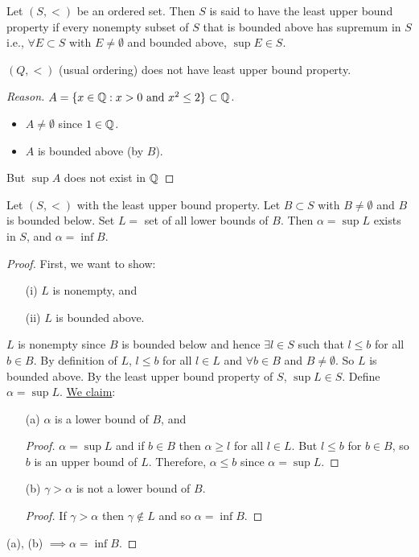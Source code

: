 \documentclass[]{article}
\begin{document}
\begin{definition}
	 Let $(S,<)$ be an ordered set. Then $S$ is said to have the least upper bound property if every nonempty subset of $S$ that is bounded above has supremum in $S$ i.e., $\forall E\subset S$ with $E\neq \emptyset$ and bounded above, $\sup E \in S$.
\end{definition}
\begin{example}
	$(Q,<)$ (usual ordering) does not have least upper bound property.
	
	\begin{proof}
		[Reason] $A = \{x\in\mathbb{Q}: x>0 \text{ and } x^2\leq 2\}\subset \mathbb{Q}$. 
		\begin{itemize}
			\item $A\neq\emptyset$ since $1\in \mathbb{Q}$.
			\item $A$ is bounded above (by $B$).
		\end{itemize}
		But $\sup A$ does not exist in $\mathbb{Q}$
	\end{proof}
\end{example}

\begin{theorem}
	Let $(S,<)$ with the least upper bound property. Let $B\subset S$ with $B\neq \emptyset$ and $B$ is bounded below.
	Set $L = $ set of all lower bounds of $B$. Then $\alpha = \sup L$ exists in $S$, and $\alpha = \inf B$.
\end{theorem}
	\begin{proof}
		First, we want to show:
		\begin{enumerate}
			\item[(i)] $L$ is nonempty, and
			\item[(ii)] $L$ is bounded above.
		\end{enumerate}
		$L$ is nonempty since $B$ is bounded below and hence $\exists l\in S$ such that $l\leq b$ for all $b\in B$. By definition of $L$, $l \leq b$ for all $l\in L$ and $\forall b\in B$ and $B\neq\emptyset$. So $L$ is bounded above.
		By the least upper bound property of $S$, $\sup L\in S$. Define $\alpha = \sup L$. \ul{We claim}:
		\begin{enumerate}
			\item[(a)] $\alpha$ is a lower bound of $B$, and
			\begin{proof}
				$\alpha = \sup L$ and if $b\in B$ then $\alpha \geq l$ for all $l\in L$. But $l\leq b$ for $b\in B$, so $b$ is an upper bound of $L$. Therefore, $\alpha \leq b$ since $\alpha = \sup L$.
			\end{proof}
			\item[(b)] $\gamma>\alpha$ is not a lower bound of $B$.
			\begin{proof}
				If $\gamma > \alpha$ then $\gamma \notin L$ and so $\alpha = \inf B$.
			\end{proof}
		\end{enumerate}
		(a), (b) $\implies \alpha = \inf B$.
	\end{proof}
\end{document}
